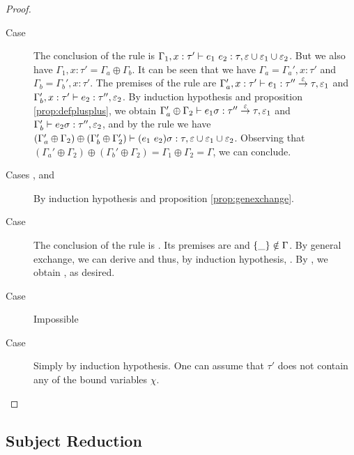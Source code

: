 \documentclass[a4paper]{article}
\begin{document}
\begin{proof}
\begin{description}
    \item[Case \apprule] The conclusion of the rule is $\Gamma_1, x :
      \tau' \vdash e_1\ e_2 : \tau, \varepsilon \cup \varepsilon_1 \cup \varepsilon_2 $. But we also have $\Gamma_1, x : \tau' =
      \Gamma_a \oplus \Gamma_b$.  It can be seen that we have $\Gamma_a = \Gamma_a', x:\tau'$ and
      $\Gamma_b = \Gamma_b', x : \tau'$. The premises of the rule are $\Gamma_a', x :
      \tau' \vdash e_1 : \tau'' \stackrel{\varepsilon}{\rightarrow} \tau, \varepsilon_1 $ and $\Gamma_b',
      x:\tau' \vdash e_2 : \tau'', \varepsilon_2 $. By induction hypothesis and proposition
      \ref{prop:defplusplus}, we obtain $\Gamma_a'\oplus \Gamma_2 \vdash e_1
      \sigma : \tau''\stackrel{\varepsilon}{\rightarrow} \tau, \varepsilon_1 $ and $\Gamma_b' \vdash e_2 \sigma : \tau'', \varepsilon_2 $, and
      by the rule \apprule{} we have $(\Gamma_a'\oplus \Gamma_2) \oplus (\Gamma_b'
      \oplus \Gamma_2') \vdash (e_1\ e_2) \sigma : \tau, \varepsilon\cup\varepsilon_1\cup\varepsilon_2 $. Observing that
      $(\Gamma_a'\oplus \Gamma_2) \oplus (\Gamma_b' \oplus \Gamma_2) = \Gamma_1 \oplus \Gamma_2 = \Gamma$, we can
      conclude.

    \item[Cases , \regionrule{} and \locrule{}] By induction
      hypothesis and proposition \ref{prop:genexchange}. 

    \item[Case \absregrule] The conclusion of the rule is . Its premises are
       and $\left\{ \_ \right\}\notin \Gamma$. By
      general exchange, we can derive 
      and thus, by induction hypothesis, . By
      \absregrule{}, we obtain
      , as desired.  
    
    \item[Case \appregrule] Impossible 
  
    \item[Case ] Simply by induction hypothesis. One can assume
      that $\tau'$ does not contain any of the bound variables $\chi$.
  \end{description}
\end{proof}

\subsection{Subject Reduction}
\label{sec:subjectreduction}
\end{document}
